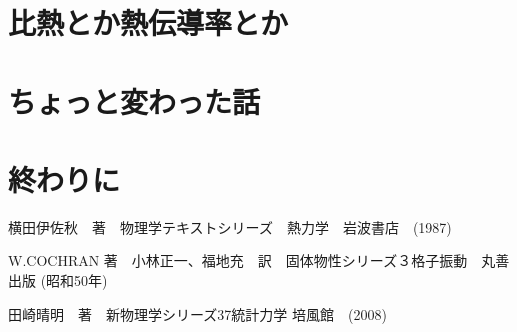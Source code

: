 \documentclass[10pt,b5paper,papersize,dvipdfmx]{jsbook}
\begin{document}
\section{比熱とか熱伝導率とか}

\section{ちょっと変わった話}

\section{終わりに}

\begin{thebibliography}{99}
    \item 横田伊佐秋　著　物理学テキストシリーズ　熱力学　岩波書店　(1987)
    \item W.COCHRAN 著　小林正一、福地充　訳　固体物性シリーズ３格子振動　丸善出版 (昭和50年)
    \item 田崎晴明　著　新物理学シリーズ37統計力学 培風館　(2008)
  \end{thebibliography}
\end{document}
